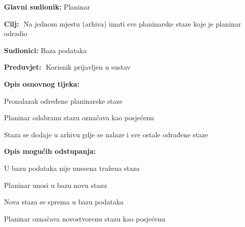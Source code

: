 		\noindent {}
		\begin{packed_item}
			
			\item \textbf{Glavni sudionik: }$ $Planinar$ $
			\item  \textbf{Cilj:} $ $ Na jednom mjestu (arhiva) imati sve planinarske staze koje je planinar odradio$ $
			\item  \textbf{Sudionici:} $ $Baza podataka $ $
			\item  \textbf{Preduvjet:} $ $ Korisnik prijavljen u sustav $ $
			\item  \textbf{Opis osnovnog tijeka:}
			
			\item[] \begin{packed_enum}
				
				\item $ $Pronalazak određene planinarske staze $ $
				\item $ $Planinar odabranu stazu označava kao posjećenu $ $
				\item $ $Staza se dodaje u arhivu gdje se nalaze i sve ostale odrađene staze$ $
				
			\end{packed_enum}
			
			\item  \textbf{Opis mogućih odstupanja:}
			
			\item[] \begin{packed_item}
				
				\item[1.a] $ $U bazu podataka nije unesena tražena staza$ $
				\item[] \begin{packed_enum}
					
					\item $ $Planinar unosi u bazu novu stazu $ $
					\item $ $Nova staza se sprema u bazu podataka $ $
					\item $ $Planinar označava novostvorenu stazu kao posjećenu $ $
				\end{packed_enum}
			\end{packed_item}
		\end{packed_item}
	
